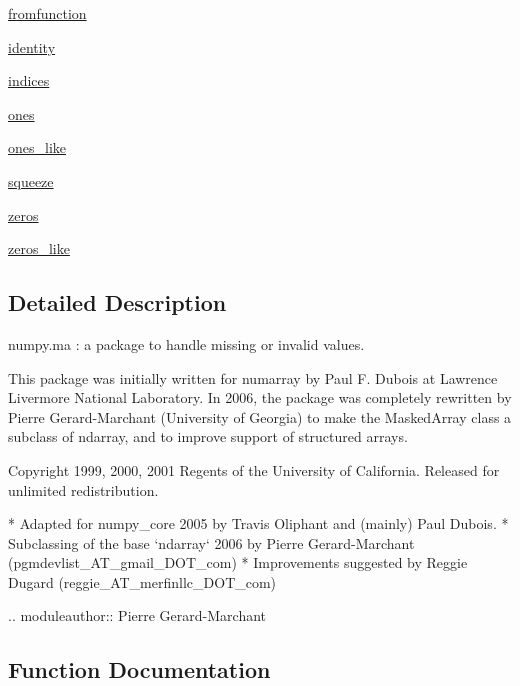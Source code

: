 \begin{DoxyCompactItemize}
\item 
\hyperlink{namespacenumpy_1_1ma_1_1core_adf0d2913ba7e564eff28cd7c243eec62}{fromfunction}
\item 
\hyperlink{namespacenumpy_1_1ma_1_1core_a27d92b83c7d72381405190793a1fbd10}{identity}
\item 
\hyperlink{namespacenumpy_1_1ma_1_1core_a1cba93d768a61f51e74e5c5f7e8233f7}{indices}
\item 
\hyperlink{namespacenumpy_1_1ma_1_1core_ac7e1120e60c622054350c7e6e1ca62c2}{ones}
\item 
\hyperlink{namespacenumpy_1_1ma_1_1core_ac83bf6449039f715038b5aafb1b4c052}{ones\+\_\+like}
\item 
\hyperlink{namespacenumpy_1_1ma_1_1core_a25bd219452b8eb46a2888a83ddac4961}{squeeze}
\item 
\hyperlink{namespacenumpy_1_1ma_1_1core_a20bba9e970ae1fccfa1bbb87e82a53ac}{zeros}
\item 
\hyperlink{namespacenumpy_1_1ma_1_1core_ae42b665e6fa6c8fcebe20cac5a452be4}{zeros\+\_\+like}
\end{DoxyCompactItemize}


\subsection{Detailed Description}
\begin{DoxyVerb}numpy.ma : a package to handle missing or invalid values.

This package was initially written for numarray by Paul F. Dubois
at Lawrence Livermore National Laboratory.
In 2006, the package was completely rewritten by Pierre Gerard-Marchant
(University of Georgia) to make the MaskedArray class a subclass of ndarray,
and to improve support of structured arrays.


Copyright 1999, 2000, 2001 Regents of the University of California.
Released for unlimited redistribution.

* Adapted for numpy_core 2005 by Travis Oliphant and (mainly) Paul Dubois.
* Subclassing of the base `ndarray` 2006 by Pierre Gerard-Marchant
  (pgmdevlist_AT_gmail_DOT_com)
* Improvements suggested by Reggie Dugard (reggie_AT_merfinllc_DOT_com)

.. moduleauthor:: Pierre Gerard-Marchant\end{DoxyVerb}
 

\subsection{Function Documentation}
\mbox{\label{namespacenumpy_1_1ma_1_1core_a8cb6a76d67cc23c41ea9fd834d50034c}} 
